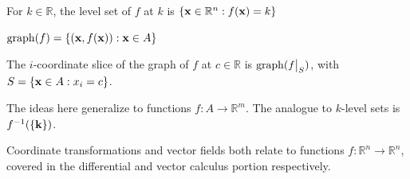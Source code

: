 \begin{definition}
    For $k \in \mathbb{R}$, the level set of $f$ at $k$ is $\{ \mathbf{x} \in \mathbb{R}^n : f(\mathbf{x}) = k \}$
\end{definition}

\begin{definition}[Graph]
    $\mathrm{graph}(f) = \{(\mathbf{x}, f(\mathbf{x})) : \mathbf{x} \in A\}$
\end{definition}


\begin{definition}[Slices]
    The $i$-coordinate slice of the graph of $f$ at $c \in \mathbb{R}$ is $\mathrm{graph}(f \big|_S)$, with $S = \{\mathbf{x} \in A : x_i = c\}$.
\end{definition}

The ideas here generalize to functions $f: A \to \mathbb{R}^m$. The analogue to $k$-level sets is $f^{-1}(\{ \mathbf{k} \})$.

\gline 

Coordinate transformations and vector fields both relate to functions $f: \mathbb{R}^n \to \mathbb{R}^n$, covered in the differential and vector calculus portion respectively.
